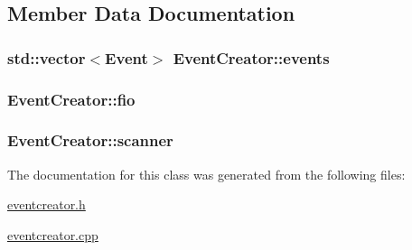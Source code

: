 \subsection{\-Member \-Data \-Documentation}
\hypertarget{classEventCreator_a8912f1587918f32a99ad9d04b80dddb6}{
\subsubsection[{events}]{\setlength{\rightskip}{0pt plus 5cm}std\-::vector$<${\bf \-Event}$>$ {\bf \-Event\-Creator\-::events}}}\label{classEventCreator_a8912f1587918f32a99ad9d04b80dddb6}
\hypertarget{classEventCreator_a77bc97278893e0291491e9a6c0442289}{
\subsubsection[{fio}]{ {\bf \-Event\-Creator\-::fio}}}\label{classEventCreator_a77bc97278893e0291491e9a6c0442289}
\hypertarget{classEventCreator_a4386d8f873758f8b15ca461c65ffbda6}{
\subsubsection[{scanner}]{ {\bf \-Event\-Creator\-::scanner}}}\label{classEventCreator_a4386d8f873758f8b15ca461c65ffbda6}


\-The documentation for this class was generated from the following files\-:\begin{DoxyCompactItemize}
\item 
\hyperlink{eventcreator_8h}{eventcreator.\-h}\item 
\hyperlink{eventcreator_8cpp}{eventcreator.\-cpp}\end{DoxyCompactItemize}

